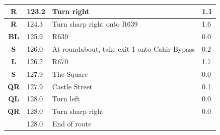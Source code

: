 \documentclass[11pt]{article}
\begin{document}
\begin{center}
\begin{supertabular}{|c|p{0.30in}|p{2.25in}|l|}
 \textbf{R} & 123.2 & Turn right &   1.1 \\ \hline
{} \textbf{R} & 124.3 & Turn sharp right onto R639 &   1.6 \\ \hline
 \textbf{BL} & 125.9 & R639 &   0.0 \\ \hline
 \textbf{S} & 126.0 & At roundabout, take exit 1 onto Cahir Bypass &   0.2 \\ \hline
 \textbf{L} & 126.2 & R670 &   1.7 \\ \hline
 \textbf{S} & 127.9 & The Square &   0.0 \\ \hline
{} \textbf{QR} & 127.9 & Castle Street &   0.1 \\ \hline
 \textbf{QL} & 128.0 & Turn left &   0.0 \\ \hline
{} \textbf{QR} & 128.0 & Turn sharp right &   0.0 \\ \hline
{} \textbf{} & 128.0 & End of route &  \\ \hline

\end{supertabular}
\end{center}
\end{document}
